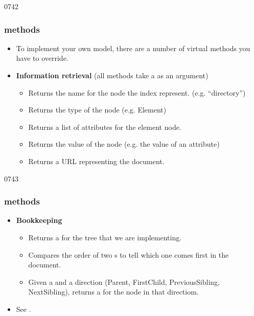 \begin{slide}{0742}\frametitle{ methods}
\begin{itemize}
\item To implement your own model, there are a number of virtual methods you
  have to override.
\item \textbf{Information retrieval} (all methods take a 
  as an argument)
  \begin{itemize}
  \item {} Returns the name for
    the node the index represent. (e.g. ``directory'')
  \item {} Returns the type of
    the node (e.g. Element)
  \item {} Returns a list
    of attributes for the element node.
  \item {} Returns the
    value of the node (e.g. the value of an attribute)
  \item {} Returns a URL
    representing the document.
  \end{itemize}
\end{itemize}
\end{slide}

\begin{slide}{0743}\frametitle{ methods}
\begin{itemize}
\item \textbf{Bookkeeping}
  \begin{itemize}
  \item {} Returns a
     for the tree that we are implementing.
  \item {} Compares the
    order of two s to tell which one comes first in
    the document.
  \item {} Given
    a  and a direction (Parent, FirstChild,
    PreviousSibling, NextSibling), returns a  for
    the node in that directiom.
  \end{itemize}
\item See .
\end{itemize}
\end{slide}
